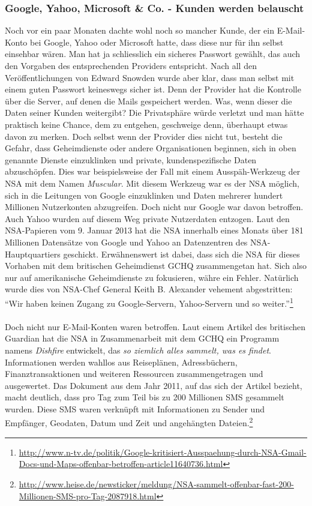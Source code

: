 \subsubsection{Google, Yahoo, Microsoft \& Co. - Kunden werden belauscht}
Noch vor ein paar Monaten dachte wohl noch so mancher Kunde, der ein E-Mail-Konto bei Google, Yahoo oder Microsoft hatte, dass diese nur für ihn selbst einsehbar wären. Man hat ja schliesslich ein sicheres Passwort gewählt, das auch den Vorgaben des entsprechenden Providers entspricht. Nach all den Veröffentlichungen von Edward Snowden wurde aber klar, dass man selbst mit einem guten Passwort keineswegs sicher ist. Denn der Provider hat die Kontrolle über die Server, auf denen die Mails gespeichert werden. Was, wenn dieser die Daten seiner Kunden weitergibt? Die Privatsphäre würde verletzt und man hätte praktisch keine Chance, dem zu entgehen, geschweige denn, überhaupt etwas davon zu merken. Doch selbst wenn der Provider dies nicht tut, besteht die Gefahr, dass Geheimdienste oder andere Organisationen beginnen, sich in oben genannte Dienste einzuklinken und private, kundenspezifische Daten abzuschöpfen. Dies war beispielsweise der Fall mit einem Ausspäh-Werkzeug der NSA mit dem Namen \textit{Muscular}. Mit diesem Werkzeug war es der NSA möglich, sich in die Leitungen von Google einzuklinken und Daten mehrerer hundert Millionen Nutzerkonten abzugreifen. Doch nicht nur Google war davon betroffen. Auch Yahoo wurden auf diesem Weg private Nutzerdaten entzogen. Laut den NSA-Papieren vom 9. Januar 2013 hat die NSA innerhalb eines Monats über 181 Millionen Datensätze von Google und Yahoo an Datenzentren des NSA-Hauptquartiers geschickt. Erwähnenswert ist dabei, dass sich die NSA für dieses Vorhaben mit dem britischen Geheimdienst GCHQ zusammengetan hat. Sich also nur auf amerikanische Geheimdienste zu fokusieren, währe ein Fehler. Natürlich wurde dies von NSA-Chef General Keith B. Alexander vehement abgestritten: ``Wir haben keinen Zugang zu Google-Servern, Yahoo-Servern und so weiter.''\footnote{\url{http://www.n-tv.de/politik/Google-kritisiert-Ausspaehung-durch-NSA-Gmail-Docs-und-Maps-offenbar-betroffen-article11640736.html}}
\\
\\
Doch nicht nur E-Mail-Konten waren betroffen. Laut einem Artikel des britischen Guardian hat die NSA in Zusammenarbeit mit dem GCHQ ein Programm namens \textit{Dishfire} entwickelt, das \textit{so ziemlich alles sammelt, was es findet}. Informationen werden wahllos aus Reiseplänen, Adressbüchern, Finanztransaktionen und weiteren Ressourcen zusammengetragen und ausgewertet. Das Dokument aus dem Jahr 2011, auf das sich der Artikel bezieht, macht deutlich, dass pro Tag zum Teil bis zu 200 Millionen SMS gesammelt wurden. Diese SMS waren verknüpft mit Informationen zu Sender und Empfänger, Geodaten, Datum und Zeit und angehängten Dateien.\footnote{\url{http://www.heise.de/newsticker/meldung/NSA-sammelt-offenbar-fast-200-Millionen-SMS-pro-Tag-2087918.html}}

